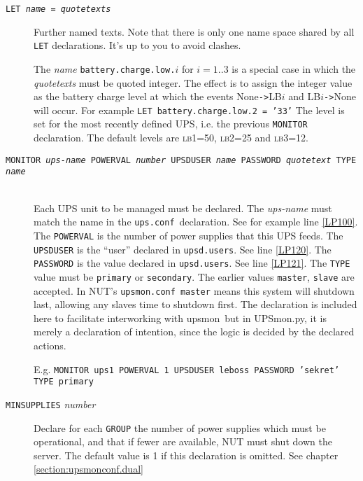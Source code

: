 \documentclass[12pt]{article}
\newcommand{\upsmon}{\mbox{\textcolor{MONCOLOUR}{upsmon}}}
\newcommand{\UPSmon}{\mbox{\textcolor{UPSMONCOLOUR}{UPSmon.py}}}
\newcommand{\LBi}{\textcolor{MONCOLOUR}{\textsc{lb1}}}
\newcommand{\LBii}{\textcolor{MONCOLOUR}{\textsc{lb2}}}
\newcommand{\LBiii}{\textcolor{MONCOLOUR}{\textsc{lb3}}}
\newcommand{\EVENT}[2]{\textcolor{MONCOLOUR}{#1}{\allowbreak}\texttt{\textcolor{MONCOLOUR}{->}}{\allowbreak}\textcolor{MONCOLOUR}{#2}}
\newcommand{\upsconf}{\textcolor{UPSDCOLOUR}{\texttt{ups.conf}}}
\newcommand{\upsdusers}{\textcolor{UPSDCOLOUR}{\texttt{upsd.users}}}
\newcommand{\upsmonconf}{\textcolor{MONCOLOUR}{\texttt{upsmon.conf}}}
\newcommand{\Ref}[1]{\ref{#1}}
\begin{document}
\begin{description}

\item[\texttt{LET \textit{name} = \textit{quotetexts}}] \hspace{7mm} Further
  named texts.  Note that there is only one name space shared by all
  \texttt{LET} declarations.  It's up to you to avoid clashes.

  The \textit{name} \texttt{battery.charge.low.}$i$ for $i = 1..3$ is a
  special case in which the \textit{quotetexts} must be quoted integer.  The
  effect is to assign the integer value as the battery charge level at which
  the events \EVENT{None}{LB$i$} and \EVENT{LB$i$}{None} will occur.  For
  example \texttt{LET battery.charge.low.2 = '33'} The level is set for the
  most recently defined UPS, i.e. the previous \texttt{MONITOR} declaration.
  The default levels are \LBi=50, \LBii=25 and \LBiii=12.

\item[\texttt{MONITOR \textit{ups-name} POWERVAL \textit{number} UPSDUSER
    \textit{name} PASSWORD \textit{quotetext} TYPE
    \textit{name}}] \ \\
  Each UPS unit to be managed must be declared.  The \textit{ups-name} must
  match the name in the \upsconf\ declaration.  See for example line
  \Ref{LP100}.  The \texttt{POWERVAL} is the number of power supplies that
  this UPS feeds.  The \texttt{UPSDUSER} is the ``user'' declared in
  \upsdusers.  See line \Ref{LP120}.  The \texttt{PASSWORD} is the value
  declared in \upsdusers.  See line \Ref{LP121}.  The \texttt{TYPE} value must
  be \texttt{primary} or \texttt{secondary}.  The earlier values
  \texttt{master}, \texttt{slave} are accepted.  In NUT's
  \upsmonconf\ \texttt{master} means this system will shutdown last, allowing
  any slaves time to shutdown first.  The declaration is included here to
  facilitate interworking with \upsmon\ but in \UPSmon, it is merely a
  declaration of intention, since the logic is decided by the declared
  actions.

  E.g. \texttt{MONITOR ups1 POWERVAL 1 UPSDUSER leboss PASSWORD 'sekret' TYPE primary}

\item[\texttt{MINSUPPLIES} \textit{number}] \hspace{7mm} 

Declare for each \texttt{GROUP} the number of power supplies which must be
operational, and that if fewer are available, NUT must shut down the server.
The default value is 1 if this declaration is omitted.  See chapter
\ref{section:upsmonconf.dual}


\end{description}
\end{document}
